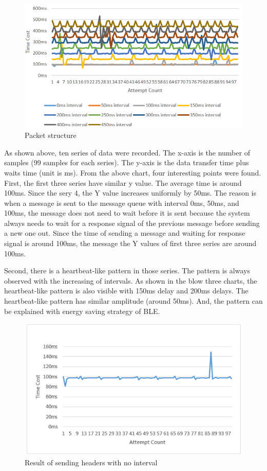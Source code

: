 \documentclass{Nan_Thesis}
\begin{document}
\begin{figure}[H]
  \centering 
      \includegraphics[scale=0.8]{pic/experiment1.png} 
  \caption{Packet structure}
\end{figure}


As shown above, ten series of data were recorded. The x-axis is the number of samples (99 samples for each series). The y-axis is the data transfer time plus waits time (unit is ms). From the above chart, four interesting points were found.
First, the first three series have similar y value. The average time is around 100ms.  Since the sery 4, the Y value increases uniformly by 50ms. The reason is when a message is sent to the message queue with interval 0ms, 50ms, and 100ms, the message does not need to wait before it is sent because the system always needs to wait for a response signal of the previous message before sending a new one out. Since the time of sending a message and waiting for response signal is around 100ms, the message the Y values of first three series are around 100ms.

Second, there is a heartbeat-like pattern in those series. The pattern is always observed with the increasing of intervals. As shown in the blow three charts, the heartbeat-like pattern is also visible with 150ms delay and 200ms delays. The heartbeat-like pattern has similar amplitude (around 50ms). And, the pattern can be explained with energy saving strategy of BLE.

\begin{figure}[H]
  \centering 
      \includegraphics[scale=1]{pic/experiment1result1.png} 
  \caption{Result of sending headers with no interval}
\end{figure}
 
\end{document}

